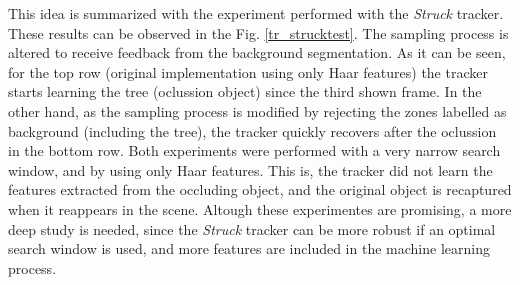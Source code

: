 This idea is summarized with the experiment performed with the {\it Struck} tracker. These results can be observed in the Fig. \ref{tr_strucktest}. The sampling process is altered to receive feedback 
from the background segmentation. As it can be seen, for the top row (original implementation using only Haar features) the tracker starts 
learning the tree (oclussion object) since the third shown frame. In the other hand, as the sampling process is modified by rejecting the zones 
labelled as background (including the tree), the tracker quickly recovers after the oclussion in the bottom row. Both experiments were performed 
with a very narrow search window, and by using only Haar features. This is, the tracker did not learn the features extracted 
from the occluding object, and the original object is recaptured when it reappears in the scene. Altough these experimentes are promising, a more deep study is needed, since the {\it Struck} tracker can be more robust if an optimal search window is used, and more features are included in 
the machine learning process.

